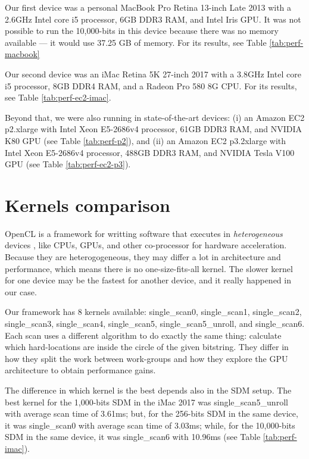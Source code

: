 Our first device was a personal MacBook Pro Retina 13-inch Late 2013 with a 2.6GHz Intel core i5 processor, 6GB DDR3 RAM, and Intel Iris GPU. It was not possible to run the 10,000-bits in this device because there was no memory available --- it would use 37.25 GB of memory. For its results, see Table \ref{tab:perf-macbook}

Our second device was an iMac Retina 5K 27-inch 2017 with a 3.8GHz Intel core i5 processor, 8GB DDR4 RAM, and a Radeon Pro 580 8G CPU. For its results, see Table \ref{tab:perf-ec2-imac}.

Beyond that, we were also running in state-of-the-art devices: (i) an Amazon EC2 p2.xlarge with Intel Xeon E5-2686v4 processor, 61GB DDR3 RAM, and NVIDIA K80 GPU (see Table \ref{tab:perf-p2}), and (ii) an Amazon EC2 p3.2xlarge with Intel Xeon E5-2686v4 processor, 488GB DDR3 RAM, and NVIDIA Tesla V100 GPU (see Table \ref{tab:perf-ec2-p3}).


\section{Kernels comparison}

OpenCL is a framework for writting software that executes in \emph{heterogeneous} devices \citep{munshi2009opencl}, like CPUs, GPUs, and other co-processor for hardware acceleration. Because they are heterogogeneous, they may differ a lot in architecture and performance, which means there is no one-size-fits-all kernel. The slower kernel for one device may be the fastest for another device, and it really happened in our case.

Our framework has 8 kernels available: single\_scan0, single\_scan1, single\_scan2, single\_scan3, single\_scan4, single\_scan5, single\_scan5\_unroll, and single\_scan6. Each scan uses a different algorithm to do exactly the same thing: calculate which hard-locations are inside the circle of the given bitstring. They differ in how they split the work between work-groups and how they explore the GPU architecture to obtain performance gains.

The difference in which kernel is the best depends also in the SDM setup. The best kernel for the 1,000-bits SDM in the iMac 2017 was single\_scan5\_unroll with average scan time of 3.61ms; but, for the 256-bits SDM in the same device, it was single\_scan0 with average scan time of 3.03ms; while, for the 10,000-bits SDM in the same device, it was single\_scan6 with 10.96ms (see Table \ref{tab:perf-imac}).

